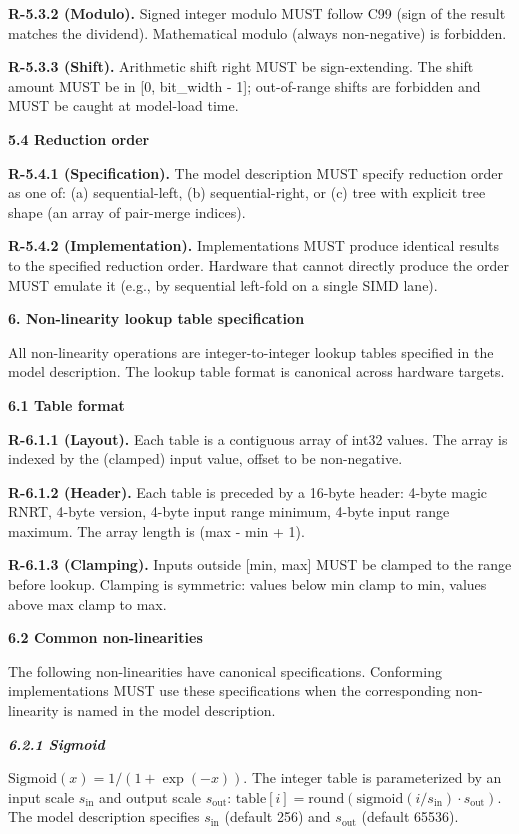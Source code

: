 \documentclass[
]{article}
\begin{document}
\textbf{R-5.3.2 (Modulo).} Signed integer modulo MUST follow C99 (sign
of the result matches the dividend). Mathematical modulo (always
non-negative) is forbidden.

\textbf{R-5.3.3 (Shift).} Arithmetic shift right MUST be sign-extending.
The shift amount MUST be in {[}0, bit\_width - 1{]}; out-of-range shifts
are forbidden and MUST be caught at model-load time.

\textbf{5.4 Reduction order}

\textbf{R-5.4.1 (Specification).} The model description MUST specify
reduction order as one of: (a) sequential-left, (b) sequential-right, or
(c) tree with explicit tree shape (an array of pair-merge indices).

\textbf{R-5.4.2 (Implementation).} Implementations MUST produce
identical results to the specified reduction order. Hardware that cannot
directly produce the order MUST emulate it (e.g., by sequential
left-fold on a single SIMD lane).

\textbf{6. Non-linearity lookup table specification}

All non-linearity operations are integer-to-integer lookup tables
specified in the model description. The lookup table format is canonical
across hardware targets.

\textbf{6.1 Table format}

\textbf{R-6.1.1 (Layout).} Each table is a contiguous array of int32
values. The array is indexed by the (clamped) input value, offset to be
non-negative.

\textbf{R-6.1.2 (Header).} Each table is preceded by a 16-byte header:
4-byte magic \textquotesingle RNRT\textquotesingle, 4-byte version,
4-byte input range minimum, 4-byte input range maximum. The array length
is (max - min + 1).

\textbf{R-6.1.3 (Clamping).} Inputs outside {[}min, max{]} MUST be
clamped to the range before lookup. Clamping is symmetric: values below
min clamp to min, values above max clamp to max.

\textbf{6.2 Common non-linearities}

The following non-linearities have canonical specifications. Conforming
implementations MUST use these specifications when the corresponding
non-linearity is named in the model description.

\emph{\textbf{6.2.1 Sigmoid}}

$\mathrm{Sigmoid}(x) = 1 / (1 + \exp(-x))$. The integer table is
parameterized by an input scale $s_{\text{in}}$ and output scale
$s_{\text{out}}$:
$\mathrm{table}[i] = \mathrm{round}(\mathrm{sigmoid}(i / s_{\text{in}}) \cdot s_{\text{out}})$.
The model description specifies $s_{\text{in}}$ (default 256) and
$s_{\text{out}}$ (default 65536).
\end{document}
